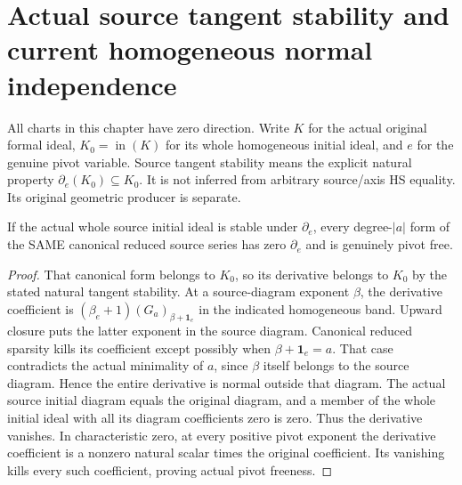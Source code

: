 \section{Actual source tangent stability and current homogeneous normal independence}

All charts in this chapter have zero direction. Write $K$ for the
actual original formal ideal, $K_0=\operatorname{in}(K)$ for its
whole homogeneous initial ideal, and $e$ for the genuine pivot variable.
Source tangent stability means the explicit natural property
$\partial_e(K_0)\subseteq K_0$. It is not inferred from arbitrary
source/axis HS equality. Its original geometric producer is separate.

\begin{theorem}
\label{hir:actual-source-tangent-stable-canonical-forms-pivot-free}
\leanok
If the actual whole source initial ideal is stable under
$\partial_e$, every degree-$|a|$ form of the SAME canonical reduced
source series has zero $\partial_e$ and is genuinely pivot free.
\end{theorem}
\begin{proof}
That canonical form belongs to $K_0$, so its derivative belongs to
$K_0$ by the stated natural tangent stability. At a source-diagram
exponent $\beta$, the derivative coefficient is
$(\beta_e+1)(G_a)_{\beta+\mathbf1_e}$ in the indicated homogeneous
band. Upward closure puts the latter exponent in the source diagram.
Canonical reduced sparsity kills its coefficient except possibly when
$\beta+\mathbf1_e=a$. That case contradicts the actual minimality
of $a$, since $\beta$ itself belongs to the source diagram. Hence the
entire derivative is normal outside that diagram. The actual source
initial diagram equals the original diagram, and a member of the
whole initial ideal with all its diagram coefficients zero is zero.
Thus the derivative vanishes. In characteristic zero, at every positive
pivot exponent the derivative coefficient is a nonzero natural scalar
times the original coefficient. Its vanishing kills every such
coefficient, proving actual pivot freeness.
\end{proof}

